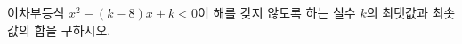 \hspace*{2mm}\begin{minipage}[t]{\dimexpr\linewidth-2mm\relax}\vspace{0pt}
이차부등식 $x^2-(k-8)x+k<0$이 해를 갖지 않도록 하는 실수 $k$의 최댓값과 최솟값의 합을 구하시오.\end{minipage}
